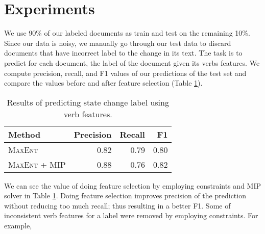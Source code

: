 \section{Experiments}

We use 90\% of our labeled documents as train and test on the remaining 10\%. Since our data is noisy, we manually go through our test data to discard documents that have incorrect label to the change in its text. The task is to predict for each document, the label of the document given its verbs features. We compute precision, recall, and F1 values of our predictions of the test set and compare the values before and after feature selection (Table \ref{table:performance}).

\begin{table}
\begin{small}
\begin{center}
\begin{tabular}{|l|r|r|r|}
\hline
Method & Precision & Recall & F1 \\
\hline
\textsc{MaxEnt} & 0.82 & 0.79 & 0.80 \\
\hline
\textsc{MaxEnt} + MIP & 0.88 & 0.76 & 0.82 \\
\hline
\end{tabular}
\caption{\label{table:performance} Results of predicting state change label using verb features.}
\end{center}
\end{small}
\end{table}

We can see the value of doing feature selection by employing constraints and MIP solver in Table \ref{table:performance}. Doing feature selection improves precision of the prediction without reducing too much recall; thus resulting in a better F1. Some of inconsistent verb features for a label were removed by employing constraints. For example, 

